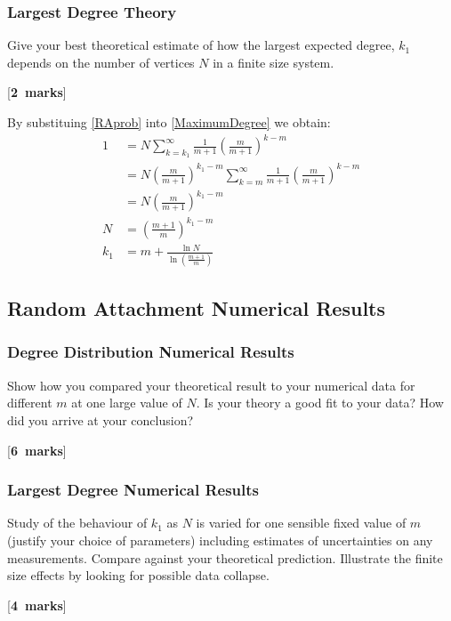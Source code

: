 \documentclass[a4paper,12pt]{article}
\newcounter{nmarks}
\newcommand{\qmarks}[1]{\addtocounter{nmarks}{#1} }
\renewcommand{\qmarks}[1]{\addtocounter{nmarks}{#1} \hspace*{\fill} [\textbf{#1~marks}]}
\begin{document}
\subsubsection{Largest Degree Theory}
Give your best theoretical estimate of how the largest expected degree, $k_\mathrm{1}$ 
depends on the number of vertices $N$ in a finite size system. \qmarks{2}

By substituing \ref{RAprob} into \ref{MaximumDegree} we obtain:
\begin{align*}
1 &= N\sum_{k=k_1}^\infty \frac{1}{m+1}\left(\frac{m}{m+1}\right)^{k-m}\\
&= N\left(\frac{m}{m+1}\right)^{k_1-m}\sum_{k=m}^\infty \frac{1}{m+1}\left(\frac{m}{m+1}\right)^{k-m}\\
&= N\left(\frac{m}{m+1}\right)^{k_1-m}\\
N &= \left(\frac{m+1}{m}\right)^{k_1-m}\\
k_1 &= m+\frac{\ln{N}}{\ln(\frac{m+1}{m})}
\end{align*}

\subsection{Random Attachment Numerical Results}

\subsubsection{Degree Distribution Numerical Results}
Show how you compared your theoretical result to your numerical data for different $m$ at one large value of $N$.  Is your theory a good fit to your data? How did you arrive at your conclusion?  \qmarks{6}

\subsubsection{Largest Degree Numerical Results}
Study of the behaviour of $k_1$ as $N$ is varied for one sensible fixed value of $m$ (justify your choice of parameters) including estimates of uncertainties on any measurements. Compare against your theoretical prediction. Illustrate the finite size effects by looking for possible data collapse.
\qmarks{4}
\end{document}
